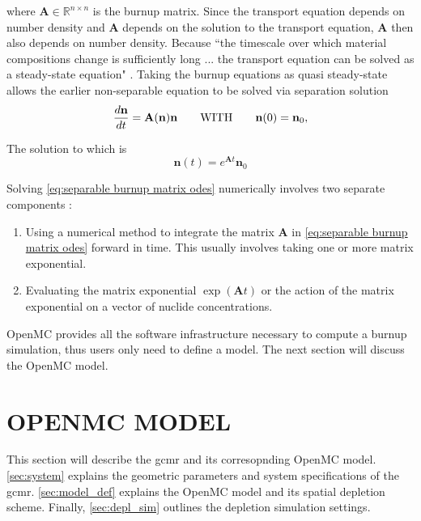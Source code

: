 \documentclass[letterpaper]{physor2024}
\begin{document}
\noindent where $\textbf{A}\in\mathbb{R}^{n\times n}$ is the burnup matrix. Since the transport equation depends on number density and $\textbf{A}$ depends on the solution to the transport equation, $\textbf{A}$ then also depends on number density. Because ``the timescale over which material compositions change is sufficiently long ... the transport equation can be solved as a steady-state equation" \cite{romano-depletion-2021}. Taking the burnup equations as quasi steady-state allows the earlier non-separable equation to be solved via separation solution
\begin{equation} \label{eq:separable burnup matrix odes}
    \frac{d\textbf{n}}{dt} =
    \textbf{A}(\textbf{n}) \textbf{n}
    \qquad \text{WITH} \qquad
    \textbf{n}(0) = \textbf{n}_{0},
\end{equation}

\noindent The solution to which is
\begin{equation} \label{eq:separation solution}
     \textbf{n}(t) = e^{\textbf{A}t} \textbf{n}_{0}
\end{equation}

\noindent Solving \cref{eq:separable burnup matrix odes} numerically involves two separate components \cite{romano-depletion-2021}:
\begin{enumerate}
    \item Using a numerical method to integrate the matrix $\textbf{A}$ in \cref{eq:separable burnup matrix odes} forward in time. This usually involves taking one or more matrix exponential.
    \item Evaluating the matrix exponential $\exp(\textbf{A}t)$ or the action of the matrix exponential on a vector of nuclide concentrations.
\end{enumerate}

OpenMC provides all the software infrastructure necessary to compute a burnup simulation, thus users only need to define a model. The next section will discuss the OpenMC model.

\section{OPENMC MODEL}\label{sec:openmc_model}
This section will describe the \gls{gcmr} and its corresopnding OpenMC model. \cref{sec:system} explains the geometric parameters and system specifications of the \gls{gcmr}. \cref{sec:model_def} explains the OpenMC model and its spatial depletion scheme. Finally, \cref{sec:depl_sim} outlines the depletion simulation settings.
\end{document}

